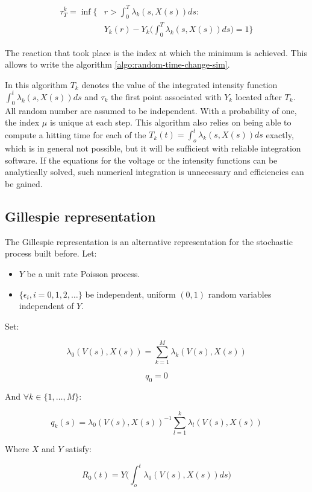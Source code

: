 		\begin{align*}
			\tau_T^k = \inf\biggl\{&r>\int_0^T\lambda_k(s, X(s))ds:\\
														 &Y_k(r)-Y_k\biggl(\int_0^T\lambda_k(s, X(s))ds\biggr)=1\biggr\}
		\end{align*}

		The reaction that took place is the index at which the minimum is achieved.
		This allows to write the algorithm \ref{algo:random-time-change-sim}.

		

		In this algorithm $T_k$ denotes the value of the integrated intensity function $\int_0^t\lambda_k(s, X(s))ds$ and $\tau_k$ the first point associated with $Y_k$ located after $T_k$.
		All random number are assumed to be independent.
		With a probability of one, the index $\mu$ is unique at each step.
		This algorithm also relies on being able to compute a hitting time for each of the $T_k(t) = \int_o^t\lambda_k(s, X(s))ds$ exactly, which is in general not possible, but it will be sufficient with reliable integration software.
		If the equations for the voltage or the intensity functions can be analytically solved, such numerical integration is unnecessary and efficiencies can be gained.

	\subsection{Gillespie representation}
	The Gillespie representation is an alternative representation for the stochastic process built before.
	Let:

	\begin{itemize}
		\item $Y$ be a unit rate Poisson process.
		\item $\{\epsilon_i, i = 0, 1, 2, \dots\}$ be independent, uniform $(0,1)$ random variables independent of $Y$.
	\end{itemize}

	Set:

	$$\lambda_0(V(s), X(s)) = \sum\limits_{k=1}^M\lambda_k(V(s), X(s))$$

	$$q_0 = 0$$

	And $\forall k\in\{1, \dots, M\}$:

	$$q_k(s) = \lambda_0(V(s), X(s))^{-1}\sum\limits_{l=1}^k\lambda_l(V(s), X(s))$$

	Where $X$ and $Y$ satisfy:

	$$R_0(t) = Y\biggl(\int_o^t\lambda_0(V(s), X(s))ds\biggr)$$

